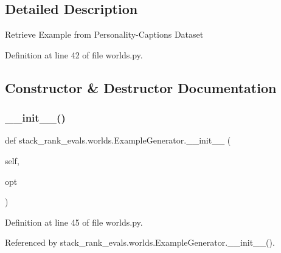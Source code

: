 \subsection{Detailed Description}
\begin{DoxyVerb}Retrieve Example from Personality-Captions Dataset\end{DoxyVerb}
 

Definition at line 42 of file worlds.\+py.



\subsection{Constructor \& Destructor Documentation}
\mbox{\label{classstack__rank__evals_1_1worlds_1_1ExampleGenerator_a6b15b72b85a0358bb6c171ef6b183c9d}} 
\subsubsection{\texorpdfstring{\+\_\+\+\_\+init\+\_\+\+\_\+()}{\_\_init\_\_()}\hspace{0.1cm}{\footnotesize\ttfamily [1/2]}}
{\footnotesize\ttfamily def stack\+\_\+rank\+\_\+evals.\+worlds.\+Example\+Generator.\+\_\+\+\_\+init\+\_\+\+\_\+ (\begin{DoxyParamCaption}\item[{}]{self,  }\item[{}]{opt }\end{DoxyParamCaption})}



Definition at line 45 of file worlds.\+py.



Referenced by stack\+\_\+rank\+\_\+evals.\+worlds.\+Example\+Generator.\+\_\+\+\_\+init\+\_\+\+\_\+().

